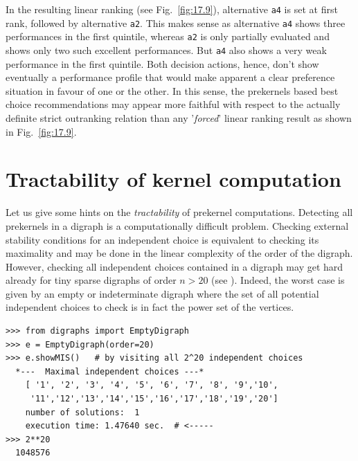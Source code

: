 In the resulting linear ranking (see Fig.~\vref{fig:17.9}), alternative \texttt{a4} is set at first rank, followed by alternative \texttt{a2}. This makes sense as alternative \texttt{a4} shows three performances in the first quintile, whereas \texttt{a2} is only partially evaluated and shows only two such excellent performances. But \texttt{a4} also shows a very weak performance in the first quintile. Both decision actions, hence, don't show eventually a performance profile that would make apparent a clear preference situation in favour of one or the other. In this sense, the prekernels based best choice recommendations may appear more faithful with respect to the actually definite strict outranking relation than any '\emph{forced}' linear ranking result as shown in Fig.~\vref{fig:17.9}.

\section{Tractability of kernel computation}
\label{sec:17.5}

Let us give some hints on the \emph{tractability} of prekernel computations. Detecting all prekernels in a digraph is a computationally difficult problem. Checking external stability conditions for an independent choice is equivalent to checking its maximality and may be done in the linear complexity of the order of the digraph. However, checking all independent choices contained in a digraph may get hard already for tiny sparse digraphs of order $n > 20$ (see \citealp{BIS-2006b}). Indeed, the worst case is given by an empty or indeterminate digraph where the set of all potential independent choices to check is in fact the power set of the vertices.
\begin{lstlisting}
>>> from digraphs import EmptyDigraph
>>> e = EmptyDigraph(order=20)
>>> e.showMIS()   # by visiting all 2^20 independent choices
  *---  Maximal independent choices ---*
    [ '1', '2', '3', '4', '5', '6', '7', '8', '9','10',
     '11','12','13','14','15','16','17','18','19','20']
    number of solutions:  1
    execution time: 1.47640 sec.  # <-----
>>> 2**20
  1048576
\end{lstlisting}

